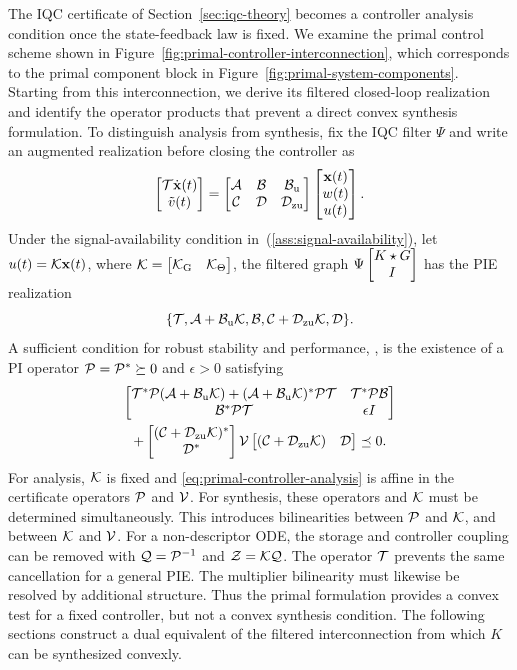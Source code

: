 The IQC certificate of Section~\ref{sec:iqc-theory} becomes a controller
analysis condition once the state-feedback law is fixed. We examine the
primal control scheme shown in
Figure~\ref{fig:primal-controller-interconnection}, which corresponds to the
primal component block in Figure~\ref{fig:primal-system-components}. Starting
from this interconnection, we derive its filtered closed-loop realization and
identify the operator products that prevent a direct convex synthesis
formulation.
\primalcontrollerfigure
\noindent To distinguish analysis from synthesis, fix the IQC filter $\Psi$ and write an
augmented realization before closing the controller as
\begin{equation}\label{eq:primal-filtered-open-loop}
\begin{bmatrix}\mathcal{T}\dot{\mathbf{x}}(t)\\\tilde v(t)\end{bmatrix}
=
\begin{bmatrix}\mathcal{A}&\mathcal{B}&\mathcal{B}_{{\mathrm{u}}}\\
       \mathcal{C}&\mathcal{D}&\mathcal{D}_{{\mathrm{zu}}}\end{bmatrix}
\begin{bmatrix}\mathbf{x}(t)\\w(t)\\u(t)\end{bmatrix}.
\end{equation}
Under the signal-availability condition
in~(\ref{ass:signal-availability}), let $u(t)=\mathcal{K}\mathbf{x}(t)$, where
$\mathcal{K}=\begin{bmatrix}\mathcal{K}_{{\mathrm{G}}}&\mathcal{K}_\Theta\end{bmatrix}$, the filtered graph
$\Psi\begin{bmatrix}K\star G\\I\end{bmatrix}$ has the PIE realization
\[
\{\mathcal{T},\mathcal{A}+\mathcal{B}_{{\mathrm{u}}}\mathcal{K},\mathcal{B},
\mathcal{C}+\mathcal{D}_{{\mathrm{zu}}}\mathcal{K},\mathcal{D}\}.
\]
A sufficient condition for robust stability and performance, \cite{lenssen2025muanalysissynthesisframeworkpartial},
is the existence of a PI operator $\mathcal{P}=\mathcal{P}^*\succeq0$ and $\epsilon>0$ satisfying
\begin{equation}\label{eq:primal-controller-analysis}
\begin{gathered}
\begin{bmatrix}\mathcal{T}^*\mathcal{P}(\mathcal{A}+\mathcal{B}_{{\mathrm{u}}}\mathcal{K})
+(\mathcal{A}+\mathcal{B}_{{\mathrm{u}}}\mathcal{K})^*\mathcal{P}\mathcal{T}
&\mathcal{T}^*\mathcal{P}\mathcal{B}\\
\mathcal{B}^*\mathcal{P}\mathcal{T}&\epsilon I\end{bmatrix}\\
+\begin{bmatrix}(\mathcal{C}+\mathcal{D}_{{\mathrm{zu}}}\mathcal{K})^*\\\mathcal{D}^*\end{bmatrix}
\mathcal{V}
\begin{bmatrix}(\mathcal{C}+\mathcal{D}_{{\mathrm{zu}}}\mathcal{K})&\mathcal{D}\end{bmatrix}
\preceq0.
\end{gathered}
\end{equation}
For analysis, $\mathcal{K}$ is fixed and
\eqref{eq:primal-controller-analysis} is affine in the certificate operators
$\mathcal{P}$ and $\mathcal{V}$. For synthesis, these operators and $\mathcal{K}$ must be
determined simultaneously. This introduces bilinearities between $\mathcal{P}$ and
$\mathcal{K}$, and between $\mathcal{K}$ and $\mathcal{V}$.
For a non-descriptor ODE, the storage and controller coupling can be removed
with $\mathcal{Q}=\mathcal{P}^{-1}$ and $\mathcal{Z}=\mathcal{K}\mathcal{Q}$. The operator $\mathcal{T}$ prevents 
the same cancellation for a general PIE. The
multiplier bilinearity must likewise be resolved by additional structure. Thus
the primal formulation provides a convex test for a fixed controller, but not
a convex synthesis condition. The following sections construct a dual
equivalent of the filtered interconnection from which $K$ can be synthesized
convexly.
